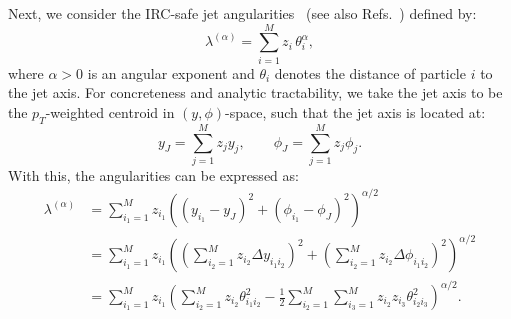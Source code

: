 \documentclass[letterpaper,11pt]{article}
\DeclareRobustCommand{\Refs}[1]{Refs.~\cite{#1}}
\begin{document}
Next, we consider the IRC-safe jet angularities~\cite{Larkoski:2014pca} (see also \Refs{Berger:2003iw,Almeida:2008yp,Ellis:2010rwa,Larkoski:2014uqa}) defined by:
\begin{equation}\lambda^{(\alpha)} = \sum_{i = 1}^M z_{i} \, \theta_{i}^\alpha,\end{equation}
where $\alpha>0$ is an angular exponent and $\theta_i$ denotes the distance of particle $i$ to the jet axis.
%
For concreteness and analytic tractability, we take the jet axis to be the $p_T$-weighted centroid in $( y,\phi)$-space, such that the jet axis is located at:
\begin{equation}
\label{eq:jetaxis}
y_J = \sum_{j=1}^M z_j  y_j, \qquad \phi_J = \sum_{j=1}^M z_j \phi_j.
\end{equation}
%
With this, the angularities can be expressed as:
\begin{align}
\lambda^{(\alpha)} &=\sum_{i_1=1}^Mz_{i_1}\left(( y_{i_1}- y_J)^2+(\phi_{i_1}-\phi_J)^2\right)^{\alpha/2}\nonumber
\\&=\sum_{i_1=1}^M z_{i_1} \left(\left(\sum_{i_2 = 1}^Mz_{i_2}\Delta y_{i_1i_2}\right)^2 + \left(\sum_{i_2 = 1}^Mz_{i_2}\Delta\phi_{i_1i_2}\right)^2\right)^{\alpha/2}\nonumber
\\&= \sum_{i_1=1}^M z_{i_1} \left(\sum_{i_2 = 1}^Mz_{i_2}\theta_{i_1i_2}^2 - \frac12 \sum_{i_2 = 1}^M\sum_{i_3 = 1}^M z_{i_2}z_{i_3} \theta_{i_2i_3}^2\right)^{\alpha/2}.\label{eq:angthetaijs}
\end{align}
\end{document}
